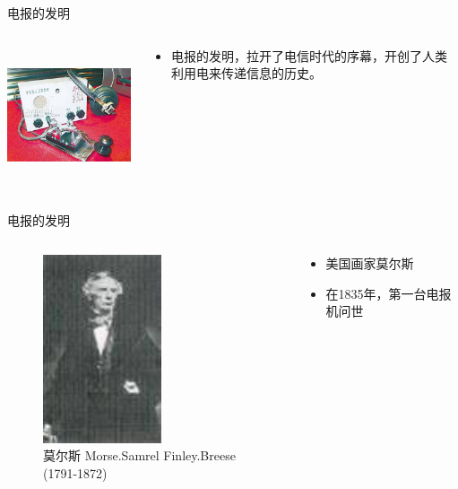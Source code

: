 \documentclass{ctexbeamer}
\begin{document}
\begin{frame}{电报的发明}
  \begin{columns}
    \begin{column}{0.5\linewidth}
      \includegraphics[height=4cm]{dianbao}
    \end{column}
    \begin{column}{0.5\linewidth}
      \begin{itemize}
        \item 电报的发明，拉开了电信时代的序幕，开创了人类利用电来传递信息的历史。
      \end{itemize}
    \end{column}
  \end{columns}
\end{frame}

\begin{frame}{电报的发明}
  \begin{columns}
    \begin{column}{0.5\linewidth}
    \begin{figure}
      \includegraphics[width=3.5cm]{Morse.jpg}
      \caption{莫尔斯 Morse.Samrel Finley.Breese (1791-1872)}\label{Morse}
    \end{figure}
    \end{column}
    \begin{column}{0.5\linewidth}
      \begin{itemize}
        \item 美国画家莫尔斯
        \item 在1835年，第一台电报机问世
      \end{itemize}
    \end{column}
  \end{columns}
\end{frame}
\end{document}
